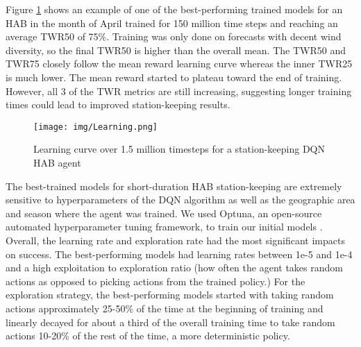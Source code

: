 Figure \ref{fig:Learning} shows an example of one of the best-performing trained models for an HAB in the month of April trained for 150 million time steps and reaching an average TWR50 of 75\%. Training was only done on forecasts with decent wind diversity, so the final TWR50 is higher than the overall mean. The TWR50 and TWR75 closely follow the mean reward learning curve whereas the inner TWR25 is much lower. The mean reward started to plateau toward the end of training. However, all 3 of the TWR metrics are still increasing, suggesting longer training times could lead to improved station-keeping results.  

\begin{figure}[h]
    \centering 
    \texttt{[image: img/Learning.png]}
    \caption{Learning curve over 1.5 million timesteps for a station-keeping DQN HAB agent} 
    \label{fig:Learning} 
\end{figure}


The best-trained models for short-duration HAB station-keeping are extremely sensitive to hyperparameters of the DQN algorithm as well as the geographic area and season where the agent was trained. We used Optuna, an open-source automated hyperparameter tuning framework, to train our initial models \cite{akiba2019optuna}. Overall, the learning rate and exploration rate had the most significant impacts on success. The best-performing models had learning rates between 1e-5 and 1e-4 and a high exploitation to exploration ratio (how often the agent takes random actions as opposed to picking actions from the trained policy.) For the exploration strategy, the best-performing models started with taking random actions approximately 25-50\% of the time at the beginning of training and linearly decayed for about a third of the overall training time to take random actions 10-20\% of the rest of the time, a more deterministic policy. 




